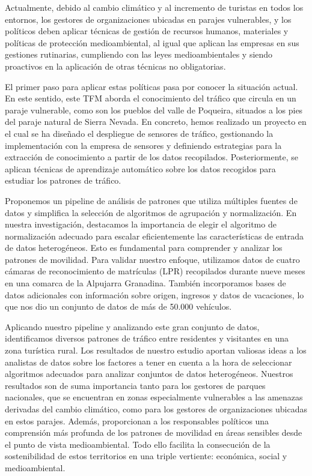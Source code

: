 
Actualmente, debido al cambio climático y al incremento de turistas en todos los entornos, los gestores de organizaciones ubicadas en parajes vulnerables, y los políticos deben aplicar técnicas de gestión de recursos humanos, materiales y políticas de protección medioambiental, al igual que aplican las empresas en sus gestiones rutinarias, cumpliendo con las leyes medioambientales y siendo proactivos en la aplicación de otras técnicas no obligatorias. 

El primer paso para aplicar estas políticas pasa por conocer la situación actual. En este sentido, este TFM aborda el conocimiento del tráfico que circula en un paraje vulnerable, como son los pueblos del valle de Poqueira, situados a los pies del paraje natural de Sierra Nevada. En concreto, hemos realizado un proyecto en el cual se ha diseñado el despliegue de sensores de tráfico, gestionando la implementación con la empresa de sensores y definiendo estrategias para la extracción de conocimiento a partir de los datos recopilados. Posteriormente, se aplican técnicas de aprendizaje automático sobre los datos recogidos para estudiar los patrones de tráfico.


Proponemos un pipeline de análisis de patrones que utiliza múltiples fuentes de datos y simplifica la selección de algoritmos de agrupación y normalización. En nuestra investigación, destacamos la importancia de elegir el algoritmo de normalización adecuado para escalar eficientemente las características de entrada de datos heterogéneos. Esto es fundamental para comprender y analizar los patrones de movilidad. Para validar nuestro enfoque, utilizamos datos de cuatro cámaras de reconocimiento de matrículas (LPR) recopilados durante nueve meses en una comarca de la Alpujarra Granadina. También incorporamos bases de datos adicionales con información sobre origen, ingresos y datos de vacaciones, lo que nos dio un conjunto de datos de más de 50.000 vehículos.

Aplicando nuestro pipeline y analizando este gran conjunto de datos, identificamos diversos patrones de tráfico entre residentes y visitantes en una zona turística rural. Los resultados de nuestro estudio aportan valiosas ideas a los analistas de datos sobre los factores a tener en cuenta a la hora de seleccionar algoritmos adecuados para analizar conjuntos de datos heterogéneos. Nuestros resultados son de suma importancia tanto para los gestores de parques nacionales, que se encuentran en zonas especialmente vulnerables a las amenazas derivadas del cambio climático, como para los gestores de organizaciones ubicadas en estos parajes. Además, proporcionan a los responsables políticos una comprensión más profunda de los patrones de movilidad en áreas sensibles desde el punto de vista medioambiental. Todo ello facilita la consecución de la sostenibilidad de estos territorios en una triple vertiente: económica, social y medioambiental.

